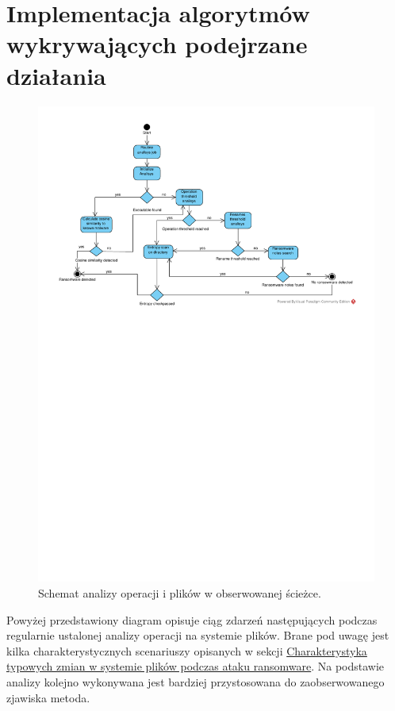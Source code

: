\section{Implementacja algorytmów wykrywających podejrzane działania}
\begin{figure}[H]
    \centering
    \includegraphics[width=0.8\linewidth]{rysunki/states.pdf}
    \caption{Schemat analizy operacji i plików w obserwowanej ścieżce.}
    \label{fig:enter-label}
\end{figure}
Powyżej przedstawiony diagram opisuje ciąg zdarzeń następujących podczas regularnie ustalonej analizy operacji na systemie plików. Brane pod uwagę jest kilka charakterystycznych scenariuszy opisanych w sekcji \hyperref[sec:charak]{Charakterystyka typowych zmian w systemie plików podczas
ataku ransomware}. Na podstawie analizy kolejno wykonywana jest bardziej przystosowana do zaobserwowanego zjawiska metoda.
